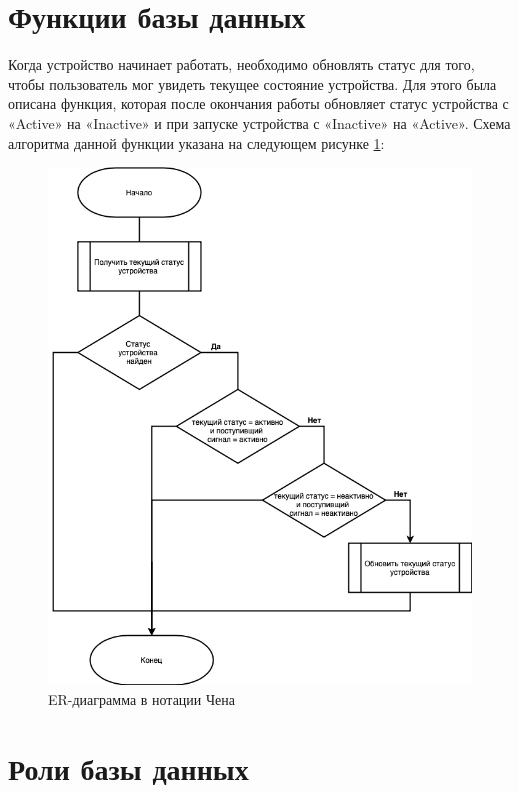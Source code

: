 \section{Функции базы данных}

Когда устройство начинает работать, необходимо обновлять 
статус для того, чтобы пользователь
мог увидеть текущее состояние устройства. 
Для этого была описана функция, которая после окончания работы
обновляет статус устройства с «Active» на «Inactive» и 
при запуске устройства с «Inactive» на «Active». 
Схема алгоритма данной функции указана на следующем рисунке
\ref{pic:func1}:

\begin{figure}[h]
    \centering 
    \includegraphics[width=0.6\linewidth]{img/updatestatusfunc.png}
    \caption{ER-диаграмма в нотации Чена}
    \label{pic:func1}
\end{figure}
\noindent
\clearpage

\section{Роли базы данных}

